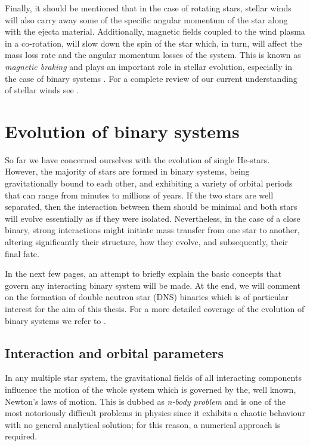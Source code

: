 \documentclass[../../main/thesis_msc.tex]{subfiles}
\begin{document}
						Finally, it should be mentioned that in the case of rotating stars, stellar winds will also carry away some of the specific angular momentum of the star along with the ejecta material. Additionally, magnetic fields coupled to the wind plasma in a co-rotation, will slow down the spin of the star which, in turn, will affect the mass loss rate and the angular momentum losses of the system. This is known as \emph{magnetic braking} and plays an important role in stellar evolution, especially in the case of binary systems \citep[see][]{Ivanova2003}. For a complete review of our current understanding of stellar winds see \cite{Lamers, smith14}.
						
					
				
	\section{Evolution of binary systems}
	
		So far we have concerned ourselves with the evolution of single He-stars. However, the majority of stars are formed in binary systems, being gravitationally bound to each other, and exhibiting a variety of orbital periods that can range from minutes to millions of years. If the two stars are well separated, then the interaction between them should be minimal and both stars will evolve essentially as if they were isolated. Nevertheless, in the case of a close binary, strong interactions might initiate mass transfer from one star to another, altering significantly their structure, how they evolve, and subsequently, their final fate.
		
		In the next few pages, an attempt to briefly explain the basic concepts that govern any interacting binary system will be made. At the end, we will comment on the formation of double neutron star (DNS) binaries which is of particular interest for the aim of this thesis. For a more detailed coverage of the evolution of binary systems we refer to \cite{Ivanova2015, podsiadlowski_2014, Postnov2014, Eggleton_book, Tauris_2006}.
		
			\subsection{Interaction and orbital parameters}
			
				In any multiple star system, the gravitational fields of all interacting components influence the motion of the whole system which is governed by the, well known, Newton's laws of motion. This is dubbed as \emph{n-body problem} and is one of the most notoriously difficult problems in physics since it exhibits a chaotic behaviour with no general analytical solution; for this reason, a numerical approach is required.
\end{document}
